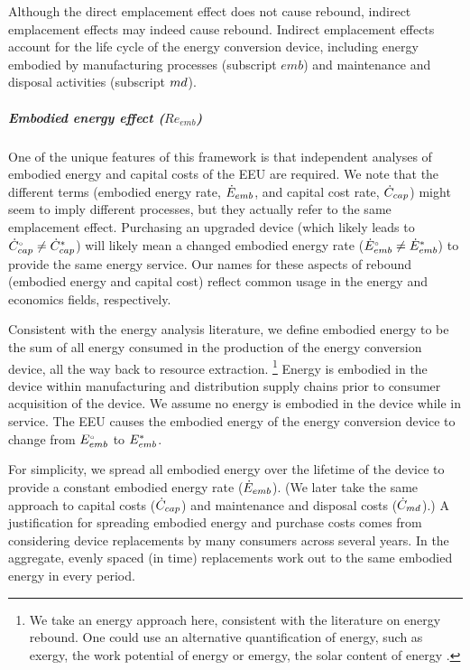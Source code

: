 \documentclass[12pt]{article}\usepackage[]{graphicx}\usepackage[]{xcolor}
\begin{document}
Although the direct emplacement effect does not cause rebound, 
indirect emplacement effects may indeed cause rebound.
Indirect emplacement effects 
account for the life cycle of the energy conversion device,
including energy embodied by manufacturing processes (subscript $emb$) and
maintenance and disposal activities (subscript $md$).


\subparagraph{Embodied energy effect ($Re_{emb}$)} 

One of the unique features of this framework
is that independent analyses of embodied energy and 
capital costs of the EEU are required.
We note that the different terms 
(embodied energy rate, $\dot{E}_{emb}$, and
capital cost rate, $\dot{C}_{cap}$)
might seem to imply different processes, 
but they actually refer to the same emplacement effect.
Purchasing an upgraded device
(which likely leads to ${}{\dot{C}}^{\scriptscriptstyle \circ}_{cap} \neq {\dot{C}}^*_{cap}$)
will likely mean a changed embodied energy rate (${}{\dot{E}}^{\scriptscriptstyle \circ}_{emb} \neq {\dot{E}}^*_{emb}$) 
to provide the same energy service.
Our names for these aspects of rebound (embodied energy and capital cost)
reflect common usage 
in the energy and economics fields, respectively.

Consistent with the energy analysis literature, 
we define embodied energy 
to be the sum of all energy
consumed in the production of the energy conversion device, 
all the way back to resource extraction.%
\footnote{
  We take an energy approach here,
  consistent with the literature on energy rebound. 
  One could use an alternative quantification of energy, 
  such as exergy, the work potential of energy \citep{Sciubba:2007aa} or
  emergy, the solar content of energy \citep{Brown:1996wy}.
}
Energy is embodied in the device within manufacturing and distribution supply chains
prior to consumer acquisition of the device.
We assume no energy is embodied in the device while in service.
The EEU causes the embodied energy of the energy conversion device to change
from ${}{E}^{\scriptscriptstyle \circ}_{emb}$ to ${E}^*_{emb}$.

For simplicity, we spread all embodied energy
over the lifetime of the device
to provide a constant embodied energy rate ($\dot{E}_{emb}$).
(We later take the same approach to capital costs ($\dot{C}_{cap}$) and
maintenance and disposal costs ($\dot{C}_{md}$).)
A justification for spreading embodied energy and 
purchase costs comes from considering
device replacements by many consumers across several years.
In the aggregate, evenly spaced (in time) replacements
work out to the same embodied energy in every period.
\end{document}
